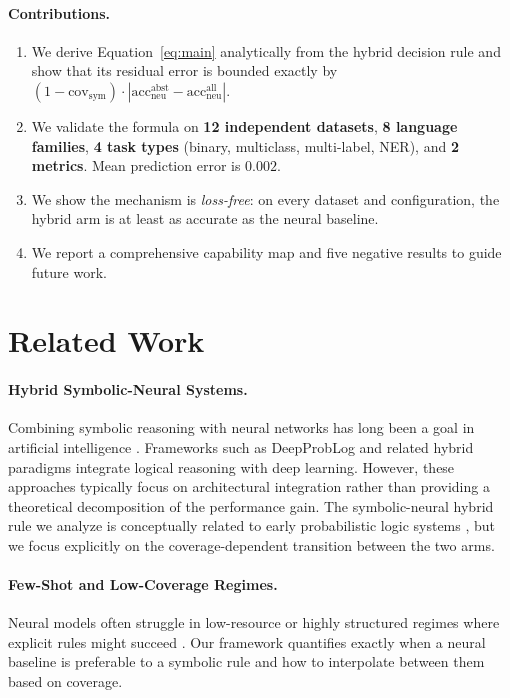 \documentclass[11pt,a4paper]{article}
\begin{document}
\paragraph{Contributions.}
\begin{enumerate}
\item We derive Equation~\ref{eq:main} analytically from the hybrid
decision rule and show that its residual error is bounded exactly by
$(1-\text{cov}_{\text{sym}}) \cdot
|\text{acc}_{\text{neu}}^{\text{abst}} -
\text{acc}_{\text{neu}}^{\text{all}}|$.
\item We validate the formula on \textbf{12 independent datasets},
\textbf{8 language families}, \textbf{4 task types} (binary, multiclass,
multi-label, NER), and \textbf{2 metrics}. Mean prediction error is $0.002$.
\item We show the mechanism is \emph{loss-free}: on every dataset and
configuration, the hybrid arm is at least as accurate as the neural
baseline.
\item We report a comprehensive capability map and five negative
results to guide future work.
\end{enumerate}

\section{Related Work}
\label{sec:related}

\paragraph{Hybrid Symbolic-Neural Systems.}
Combining symbolic reasoning with neural networks has long been a goal in artificial intelligence \cite{garcez2023neurosymbolic, marcus2020next}. Frameworks such as DeepProbLog \cite{manhaeve2018deepproblog} and related hybrid paradigms \cite{bengio2021hybrid} integrate logical reasoning with deep learning. However, these approaches typically focus on architectural integration rather than providing a theoretical decomposition of the performance gain. The symbolic-neural hybrid rule we analyze is conceptually related to early probabilistic logic systems \cite{silveira2014gold}, but we focus explicitly on the coverage-dependent transition between the two arms.

\paragraph{Few-Shot and Low-Coverage Regimes.}
Neural models often struggle in low-resource or highly structured regimes where explicit rules might succeed \cite{wang2020fewshot}. Our framework quantifies exactly when a neural baseline is preferable to a symbolic rule and how to interpolate between them based on coverage.
\end{document}
